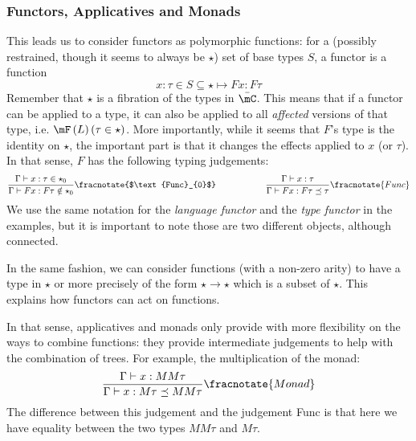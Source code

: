 \documentclass[math, english, info]{cours}
\begin{document}
\subsubsection{Functors, Applicatives and Monads}\label{subsubsec:functors}
This leads us to consider functors as polymorphic functions: for a (possibly restrained, though it seems to always be $\star$) set of base types $S$, a functor is a function
\begin{equation*}
	x: \tau\in S\subseteq \star \mapsto F x: F\tau
\end{equation*}
Remember that $\star$ is a fibration of the types in $\bar{\mC}$.
This means that if a functor can be applied to a type, it can also be applied to all \emph{affected} versions of that type, i.e. $\mF\left( L \right)(\tau\in \star)$.
More importantly, while it seems that $F$'s type is the identity on $\star$, the important part is that it changes the effects applied to $x$ (or $\tau$).
In that sense, $F$ has the following typing judgements:
\begin{equation*}
	\frac{\Gamma\vdash x: \tau \in \star_{0}}{\Gamma\vdash F x: F\tau \notin \star_{0}}\fracnotate{$\text{Func}_{0}$} \hspace{2cm} \frac{\Gamma\vdash x: \tau}{\Gamma\vdash Fx : F\tau\preceq \tau}\fracnotate{Func}
\end{equation*}
We use the same notation for the \emph{language functor} and the \emph{type functor} in the examples, but it is important to note those are two different objects, although connected.

In the same fashion, we can consider functions (with a non-zero arity) to have a type in $\star$ or more precisely of the form $\star \to \star$ which is a subset of $\star$.
This explains how functors can act on functions.

In that sense, applicatives and monads only provide with more flexibility on the ways to combine functions:
they provide intermediate judgements to help with the combination of trees. For example, the multiplication of the monad:
\begin{equation*}
	\frac{\Gamma\vdash x: MM\tau}{\Gamma\vdash x: M\tau \preceq MM\tau}\fracnotate{Monad}
\end{equation*}
The difference between this judgement and the judgement Func is that here we have equality between the two types $MM\tau$ and $M\tau$.
\end{document}
